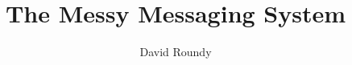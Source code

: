 \documentclass[letterpaper,twocolumn,amsmath,amssymb,pre,aps,10pt]{revtex4-1}
\begin{document}
\title{The Messy Messaging System}
\author{David Roundy}

\maketitle

\end{document}
